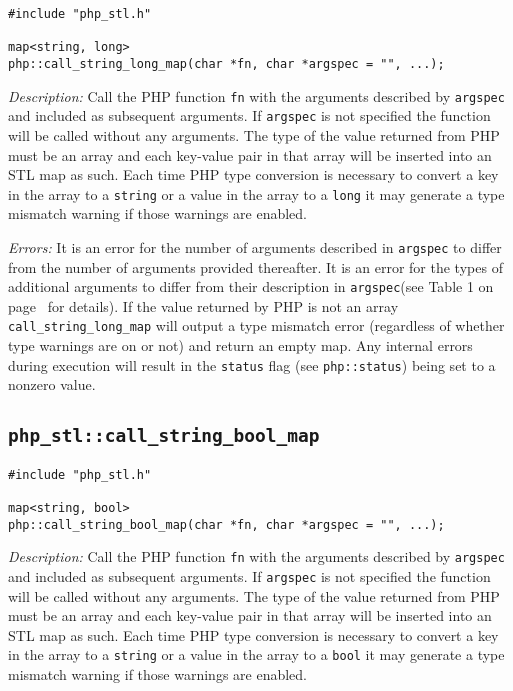 \documentclass[11pt,titlepage]{article}
\begin{document}
\begin{verbatim}
#include "php_stl.h"

map<string, long> 
php::call_string_long_map(char *fn, char *argspec = "", ...);
\end{verbatim}

\emph{Description:} Call the PHP function \verb|fn| with the arguments described by \verb|argspec| and included as subsequent arguments. If \verb|argspec| is not specified the function will be called without any arguments. The type of the value returned from PHP must be an array and each key-value pair in that array will be inserted into an STL map as such. Each time PHP type conversion is necessary to convert a key in the array to a \verb|string| or a value in the array to a \verb|long| it may generate a type mismatch warning if those warnings are enabled.

\emph{Errors:} It is an error for the number of arguments described in \verb|argspec| to differ from the number of arguments provided thereafter. It is an error for the types of additional arguments to differ from their description in \verb|argspec|(see Table 1 on page~\pageref{Table1} for details). If the value returned by PHP is not an array \verb|call_string_long_map| will output a type mismatch error (regardless of whether type warnings are on or not) and return an empty map. Any internal errors during execution will result in the \verb|status| flag (see \verb|php::status|) being set to a nonzero value.


\subsection{\texttt{php\_stl::call\_string\_bool\_map}}

\begin{verbatim}
#include "php_stl.h"

map<string, bool> 
php::call_string_bool_map(char *fn, char *argspec = "", ...);
\end{verbatim}

\emph{Description:} Call the PHP function \verb|fn| with the arguments described by \verb|argspec| and included as subsequent arguments. If \verb|argspec| is not specified the function will be called without any arguments. The type of the value returned from PHP must be an array and each key-value pair in that array will be inserted into an STL map as such. Each time PHP type conversion is necessary to convert a key in the array to a \verb|string| or a value in the array to a \verb|bool| it may generate a type mismatch warning if those warnings are enabled.
\end{document}
